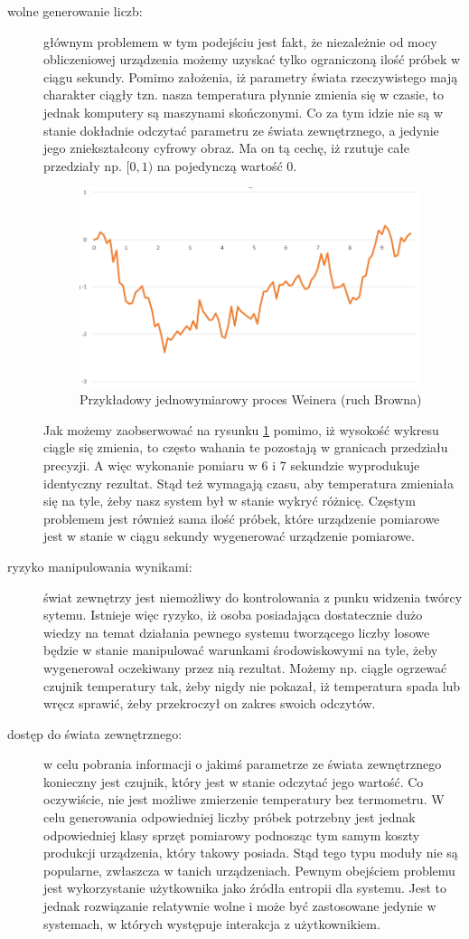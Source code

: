 \begin{description}
\item[wolne generowanie liczb:] głównym problemem w tym podejściu jest fakt, że niezależnie od mocy obliczeniowej urządzenia możemy uzyskać tylko ograniczoną ilość próbek w ciągu sekundy. Pomimo założenia, iż parametry świata rzeczywistego mają charakter ciągły tzn. nasza temperatura płynnie zmienia się w czasie, to jednak komputery są maszynami skończonymi. Co za tym idzie nie są w stanie dokładnie odczytać parametru ze świata zewnętrznego, a jedynie jego zniekształcony cyfrowy obraz. Ma on tą cechę, iż rzutuje całe przedziały np. $[0, 1)$ na pojedynczą wartość 0.
\begin{figure}[!htp]
    \centering
    \includegraphics[width=10cm]{brown}
    \caption{Przykładowy jednowymiarowy proces Weinera (ruch Browna)}
    \label{fig:brown}
\end{figure}
Jak możemy zaobserwować na rysunku \ref{fig:brown} pomimo, iż wysokość wykresu ciągle się zmienia, to często wahania te pozostają w granicach przedziału precyzji. A więc wykonanie pomiaru w 6 i 7 sekundzie wyprodukuje identyczny rezultat. Stąd też wymagają czasu, aby temperatura zmieniała się na tyle, żeby nasz system był w stanie wykryć różnicę. Częstym problemem jest również sama ilość próbek, które urządzenie pomiarowe jest w stanie w ciągu sekundy wygenerować urządzenie pomiarowe.
\item[ryzyko manipulowania wynikami:] świat zewnętrzy jest niemożliwy do kontrolowania z punku widzenia twórcy sytemu. Istnieje więc ryzyko, iż osoba posiadająca dostatecznie dużo wiedzy na temat działania pewnego systemu tworzącego liczby losowe będzie w stanie manipulować warunkami środowiskowymi na tyle, żeby wygenerował oczekiwany przez nią rezultat. Możemy np. ciągle ogrzewać czujnik temperatury tak, żeby nigdy nie pokazał, iż temperatura spada lub wręcz sprawić, żeby przekroczył on zakres swoich odczytów.
\item[dostęp do świata zewnętrznego:] w celu pobrania informacji o jakimś parametrze ze świata zewnętrznego konieczny jest czujnik, który jest w stanie odczytać jego wartość. Co oczywiście, nie jest możliwe zmierzenie temperatury bez termometru. W celu generowania odpowiedniej liczby próbek potrzebny jest jednak odpowiedniej klasy sprzęt pomiarowy podnosząc tym samym koszty produkcji urządzenia, który takowy posiada. Stąd tego typu moduły nie są popularne, zwłaszcza w tanich urządzeniach. Pewnym obejściem problemu jest wykorzystanie użytkownika jako źródła entropii dla systemu. Jest to jednak rozwiązanie relatywnie wolne i może być zastosowane jedynie w systemach, w których występuje interakcja z użytkownikiem.

\end{description}
